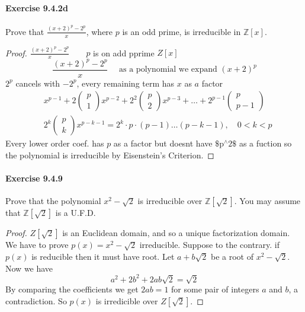 \documentclass{article}
\theoremstyle{definition}
\begin{document}
\paragraph{Exercise 9.4.2d} Prove that $\frac{(x+2)^p-2^p}{x}$, where $p$ is an odd prime, is irreducible in $\mathbb{Z}[x]$.
\begin{proof}
$\frac{(x+2)^p-2^p}{x} \quad \quad p$ is on add pprime $Z[x]$
$$
\frac{(x+2)^p-2^p}{x} \quad \text { as a polynomial we expand }(x+2)^p
$$
$2^p$ cancels with $-2^p$, every remaining term has $x$ as $a$ factor
$$
\begin{aligned}
& x^{p-1}+2\left(\begin{array}{l}
p \\
1
\end{array}\right) x^{p-2}+2^2\left(\begin{array}{l}
p \\
2
\end{array}\right) x^{p-3}+\ldots+2^{p-1}\left(\begin{array}{c}
p \\
p-1
\end{array}\right) \\
& 2^k\left(\begin{array}{l}
p \\
k
\end{array}\right) x^{p-k-1}=2^k \cdot p \cdot(p-1) \ldots(p-k-1), \quad 0<k<p
\end{aligned}
$$
Every lower order coef. has $p$ as a factor but doesnt have $\$ \mathrm{p}^{\wedge} 2 \$$ as a fuction so the polynomial is irreducible by Eisenstein's Criterion.
\end{proof}



\paragraph{Exercise 9.4.9} Prove that the polynomial $x^{2}-\sqrt{2}$ is irreducible over $\mathbb{Z}[\sqrt{2}]$. You may assume that $\mathbb{Z}[\sqrt{2}]$ is a U.F.D.
\begin{proof}
$Z[\sqrt{2}]$ is an Euclidean domain, and so a unique factorization domain.
We have to prove $p(x)=x^2-\sqrt{2}$ irreducible.
Suppose to the contrary.
if $p(x)$ is reducible then it must have root.
Let $a+b \sqrt{2}$ be a root of $x^2-\sqrt{2}$.
Now we have
$$
a^2+2 b^2+2 a b \sqrt{2}=\sqrt{2}
$$
By comparing the coefficients we get $2 a b=1$ for some pair of integers $a$ and $b$, a contradiction.
So $p(x)$ is irredicible over $Z[\sqrt{2}]$.
\end{proof}
\end{document}
